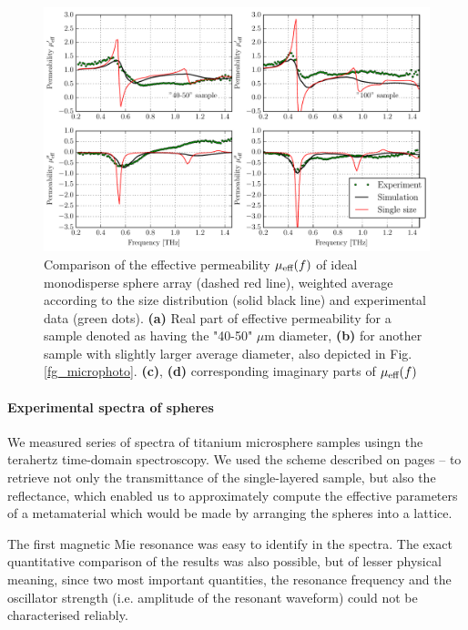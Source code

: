 \begin{figure}[ht]   %
	 \caption[Comparison of the effective permeability $\meff(f)$ of ideal monodisperse sphere array, weighted average according to the size distribution and experimental data]{Comparison of the effective permeability $\meff(f)$ of ideal monodisperse sphere array (dashed red line), weighted average according to the size distribution (solid black line) and experimental data (green dots). \textbf{(a)} Real part of effective permeability for a sample denoted as having the "40-50" $\mu$m diameter, \textbf{(b)} for another sample with slightly larger average diameter, also depicted in Fig. \ref{fg_microphoto}. \textbf{(c)}, \textbf{(d)} corresponding imaginary parts of $\meff(f)$}
\label{fg_mm2012_convolution} \centering 
\includegraphics[width=\textwidth]{img-expe/sphere_convolution/mm2012_convolution.pdf}
\end{figure}
\paragraph{Experimental spectra of spheres} %
We measured series of spectra of titanium microsphere samples usingn the terahertz time-domain spectroscopy. We used the scheme described on pages \pageref{srtm}--\pageref{srtm2} to retrieve not only the transmittance of the single-layered sample, but also the reflectance, which enabled us to approximately compute the effective parameters of a metamaterial which would be made by arranging the spheres into a lattice. 

The first magnetic Mie resonance was easy to identify in the spectra. The exact quantitative comparison of the results was also possible, but of lesser physical meaning, since two most important quantities, the resonance frequency and the oscillator strength (i.e. amplitude of the resonant waveform) could not be characterised reliably. 

